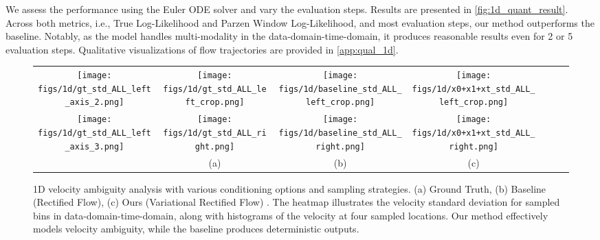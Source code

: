 We assess the performance using the Euler ODE solver and vary the evaluation steps. Results are presented in \cref{fig:1d_quant_result}. Across both metrics, i.e., True Log-Likelihood and Parzen Window Log-Likelihood, and most evaluation steps, our method outperforms the baseline. Notably, as the model  handles multi-modality in the data-domain-time-domain, it produces reasonable results even for 2 or 5 evaluation steps. Qualitative visualizations of flow trajectories are provided in \cref{app:qual_1d}. 



\begin{figure}[t]
    \vspace{-0.2cm}
    \centering
    \begin{tabular}{ccccccc}
    \hspace{-0.02\linewidth}\texttt{[image: figs/1d/gt\_std\_ALL\_left\_axis\_2.png]} &
    \hspace{-0.025\linewidth}\texttt{[image: figs/1d/gt\_std\_ALL\_left\_crop.png]} &
    \hspace{-0.015\linewidth}\texttt{[image: figs/1d/baseline\_std\_ALL\_left\_crop.png]} &
    \hspace{-0.015\linewidth}\texttt{[image: figs/1d/x0+x1+xt\_std\_ALL\_left\_crop.png]} \\
    \hspace{-0.02\linewidth}\texttt{[image: figs/1d/gt\_std\_ALL\_left\_axis\_3.png]} &
    \hspace{-0.025\linewidth}\texttt{[image: figs/1d/gt\_std\_ALL\_right.png]} &
    \hspace{-0.015\linewidth}\texttt{[image: figs/1d/baseline\_std\_ALL\_right.png]} &
    \hspace{-0.015\linewidth}\texttt{[image: figs/1d/x0+x1+xt\_std\_ALL\_right.png]} \\
    & (a) & (b) & (c) \\
    \end{tabular}
    \vspace{-0.8em}
    \caption{1D velocity ambiguity analysis with various conditioning options and sampling strategies. (a) Ground Truth, (b) Baseline (Rectified Flow), 
    (c) Ours (Variational Rectified Flow)
    . The heatmap illustrates the velocity standard deviation for sampled bins in data-domain-time-domain, along with histograms of the velocity at four sampled locations. Our method effectively models velocity ambiguity, while the baseline  produces deterministic outputs. %
    }
    \vspace{0.5em}
    \label{fig:1d_analysis}
\end{figure}

